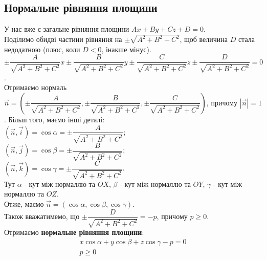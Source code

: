 \documentclass[a4paper, 10pt]{extarticle}
\theoremstyle{theoremdd}
\theoremstyle{theoremdd}
\theoremstyle{theoremdd}
\theoremstyle{theoremdd}
\theoremstyle{theoremdd}
\theoremstyle{theoremdd}
\theoremstyle{theoremdd}
\theoremstyle{theoremdd}
\begin{document}
\subsection{Нормальне рівняння площини}
У нас вже є загальне рівняння площини $Ax + By + Cz + D = 0$.\\
Поділимо обидві частини рівняння на $\pm \sqrt{A^2+B^2+C^2}$, щоб величина $D$ стала недодатною (плюс, коли $D<0$, інакше мінус).\\
$\pm \dfrac{A}{\sqrt{A^2+B^2+C^2}}x \pm \dfrac{B}{\sqrt{A^2+B^2+C^2}}y \pm \dfrac{C}{\sqrt{A^2+B^2+C^2}}z \pm \dfrac{D}{\sqrt{A^2+B^2+C^2}} = 0$.\\
Отримаємо нормаль $\vec{n} = \left(\pm \dfrac{A}{\sqrt{A^2+B^2+C^2}}, \pm \dfrac{B}{\sqrt{A^2+B^2+C^2}}, \pm \dfrac{C}{\sqrt{A^2+B^2+C^2}} \right)$, причому $|\vec{n}| = 1$. Більш того, маємо інші деталі:\\
$(\vec{n}, \vec{i}) = \cos \alpha = \pm \dfrac{A}{\sqrt{A^2+B^2+C^2}}$;\\
$(\vec{n}, \vec{j}) = \cos \beta = \pm \dfrac{B}{\sqrt{A^2+B^2+C^2}}$;\\
$(\vec{n}, \vec{k}) = \cos \gamma = \pm \dfrac{C}{\sqrt{A^2+B^2+C^2}}$.\\
Тут $\alpha$ - кут між нормаллю та $OX$, $\beta$ - кут між нормаллю та $OY$, $\gamma$ - кут між нормаллю та $OZ$.\\
Отже, маємо $\vec{n} = (\cos \alpha, \cos \beta, \cos \gamma)$.\\
Також вважатимемо, що $\pm \dfrac{D}{\sqrt{A^2+B^2+C^2}} = -p$, причому $p \geq 0$.\\
Отримаємо \textbf{нормальне рівняння площини}:
\begin{align*}
x \cos \alpha + y \cos \beta + z \cos \gamma - p = 0 \\
p \geq 0
\end{align*}

\begin{figure}[H]
\centering
{}
\end{figure}
\end{document}
